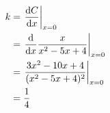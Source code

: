 \documentclass{echw}
\begin{document}
            \begin{equation*}
                \begin{aligned}
                    k &= \left.\dfrac{\mathrm{d} C}{\mathrm{d} x}\right|_{x=0}\\
                    &= \left.\dfrac{\mathrm{d} }{\mathrm{d} x}\dfrac{x}{x^2-5x+4}\right|_{x=0} \\
                    &= \left.\dfrac{3x^2-10x+4}{(x^2-5x+4)^2}\right|_{x=0} \\
                    &= \dfrac14
                \end{aligned}
            \end{equation*}

\end{document}
